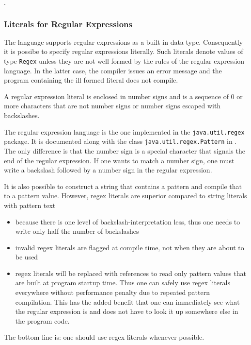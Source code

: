 .

\subsubsection{Literals for Regular Expressions} \label{regexliteral}

The \frege{} language supports regular expressions as a built in data type. Consequently it is possibe to specify regular expressions literally. Such literals denote values of type \texttt{Regex} unless they are not well formed by the rules of the regular expression language. In the latter case, the compiler issues an error message and the program containing the ill formed literal does not compile.

\begin{flushleft}
 
\end{flushleft}

A regular expression literal is enclosed in number signs and is a sequence of 0 or more characters that are not number signs or number signs escaped with backslashes.

The regular expression language is the one implemented in the \texttt{java.util.regex} package. It is documented along with the class \texttt{java.util.regex.Pattern} in \cite{apidoc}.
The only difference is that the number sign is a special character that signals the end of the regular expression.
If one wants to match a number sign, one must write a backslash followed by a number sign in the regular expression.


It is also possible to construct a string that contains a pattern and compile that to a pattern value. However, regex literals are superior compared to string literals with pattern text
\begin{itemize}
\item because there is one level of backslash-interpretation less, thus one needs to write only half the number of backslashes
\item invalid regex literals are flagged at compile time, not when they are about to be used
\item regex literals will be replaced with references to read only pattern values that are built at program startup time. Thus one can safely use regex literals everywhere without performance penalty due to repeated pattern compilation. This has the added benefit that one can immediately see what the regular expression is and does not have to look it up somewhere else in the program code.
\end{itemize}
The bottom line is: one should use regex literals whenever possible.

